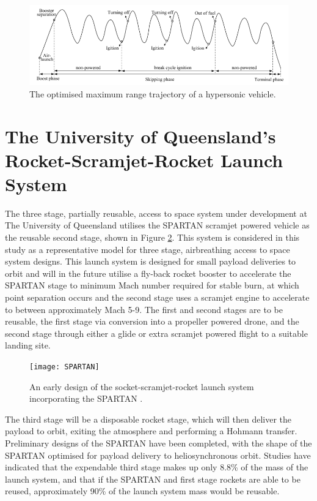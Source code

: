  \begin{figure}[ht]
 	\centering
 	\includegraphics[width=0.9\linewidth]{"figures/2_literature-review/chai-boost skip"}
 	\caption{The optimised maximum range trajectory of a hypersonic vehicle\cite{Chai2015}.}
 	\label{fig:chai-boostskip}
 \end{figure}



\section{The University of Queensland's Rocket-Scramjet-Rocket Launch System}


The three stage, partially reusable, access to space system under development at The University of Queensland utilises the SPARTAN\cite{Jazra2013} scramjet powered vehicle as the reusable second stage, shown in Figure \ref{fig:SPARTAN}. This system is considered in this study as a representative model for three stage, airbreathing access to space system designs. This launch system is designed for small payload deliveries to orbit and will in the future utilise a fly-back rocket booster to accelerate the SPARTAN stage to minimum Mach number required for stable burn, at which point separation occurs and the second stage uses a scramjet engine to accelerate to between approximately Mach 5-9. The first and second stages are to be reusable, the first stage via conversion into a propeller powered drone, and the second stage through either a glide or extra scramjet powered flight to a suitable landing site.
\begin{figure}[ht]
	\centering
	\texttt{[image: SPARTAN]}
	\caption{An early design of the socket-scramjet-rocket launch system incorporating the SPARTAN \cite{Jazra2013}.}
	\label{fig:SPARTAN}
\end{figure}
The third stage will be a disposable rocket stage, which will then deliver the payload to orbit, exiting the atmosphere and performing a Hohmann transfer. 
Preliminary designs of the SPARTAN have been completed, with the shape of the SPARTAN optimised for payload delivery to heliosynchronous orbit.
Studies have indicated that the expendable third stage makes up only 8.8\% of the mass of the launch system, and that if the SPARTAN and first stage rockets are able to be reused, approximately 90\% of the launch system mass would be reusable\cite{Preller2017}.

